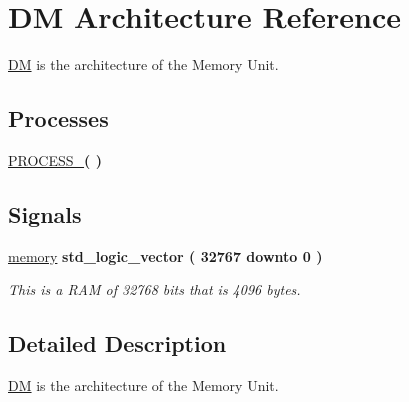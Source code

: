 \hypertarget{class_m_a_unit_1_1_d_m}{\section{D\-M Architecture Reference}
\label{class_m_a_unit_1_1_d_m}
}


\hyperlink{class_m_a_unit_1_1_d_m}{D\-M} is the architecture of the Memory Unit.  


\subsection*{Processes}
 \begin{DoxyCompactItemize}
\item 
\hyperlink{class_m_a_unit_1_1_d_m_a031269c3515f7279dab9aede82457a06}{P\-R\-O\-C\-E\-S\-S\-\_}{\bfseries  (  )}
\end{DoxyCompactItemize}
\subsection*{Signals}
 \begin{DoxyCompactItemize}
\item 
\hypertarget{class_m_a_unit_1_1_d_m_adf7b76e5328ace047ce913f5dd9bd24a}{\hyperlink{class_m_a_unit_1_1_d_m_adf7b76e5328ace047ce913f5dd9bd24a}{memory} {\bfseries \textcolor{comment}{std\-\_\-logic\-\_\-vector}\textcolor{vhdlchar}{ }\textcolor{vhdlchar}{(}\textcolor{vhdlchar}{ } \textcolor{vhdldigit}{32767} \textcolor{vhdlchar}{ }\textcolor{vhdlchar}{ }\textcolor{vhdlchar}{ }\textcolor{vhdlkeyword}{downto}\textcolor{vhdlchar}{ }\textcolor{vhdlchar}{ }\textcolor{vhdlchar}{ } \textcolor{vhdldigit}{0} \textcolor{vhdlchar}{ }\textcolor{vhdlchar}{)}\textcolor{vhdlchar}{ }} }\label{class_m_a_unit_1_1_d_m_adf7b76e5328ace047ce913f5dd9bd24a}

\begin{DoxyCompactList}\small\item\em This is a R\-A\-M of 32768 bits that is 4096 bytes. \end{DoxyCompactList}\end{DoxyCompactItemize}


\subsection{Detailed Description}
\hyperlink{class_m_a_unit_1_1_d_m}{D\-M} is the architecture of the Memory Unit. 

